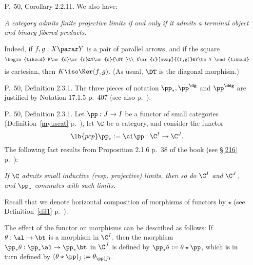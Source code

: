 \documentclass[12pt]{article}
\theoremstyle{remark}
\theoremstyle{definition}
\begin{document}


\begin{s}
P.~50, Corollary 2.2.11. We also have:

\emph{A category admits finite projective limits if and only if it admits a terminal object and binary fibered products.}

Indeed, if $f,g:X\parar Y$ is a pair of parallel arrows, and if the square 
$$
\begin{tikzcd}
K\ar{d}\ar{r}&Y\ar{d}{\DT}\\ 
X\ar{r}[swap]{(f,g)}&Y\tm Y
\end{tikzcd}
$$
is cartesian, then $K\iso\Ker(f,g)$. (As usual, $\DT$ is the diagonal morphism.)
\end{s}

%

\begin{s}
P.~50, Definition 2.3.1. The three pieces of notation $\pp_*,\pp^\dg$ and $\pp^\ddg$ are justified by Notation 17.1.5 p.~407 (see also  p.~). 
\end{s} 

% 

\begin{s}
P.~50, Definition 2.3.1. Let $\pp:J\to I$ be a functor of small categories (Definition~\ref{myuscat} p.~), let $\C$ be a category, and consider the functor 
\begin{equation}\lb{pcp}
\pp_*:=\ci\pp:\C^I\to\C^J.
\end{equation}
The following fact results from Proposition 2.1.6 p.~38 of the book (see \S\ref{216} p.~): 

\emph{If $\C$ admits small inductive (resp. projective) limits, then so do $\C^I$ and $\C^J$, and $\pp_*$ commutes with such limits.} 

Recall that we denote horizontal composition of morphisms of functors by $\star$ (see Definition~\ref{dil1} p.~).

The effect of the functor  on morphisms can be described as follows: If $\theta:\al\to\bt$ is a morphism in $\C^I$, then the morphism $\pp_*\theta:\pp_*\al\to\pp_*\bt$ in $\C^J$ is defined by $\pp_*\theta:=\theta\star\pp$, which is in turn defined by $(\theta\star\pp)_j:=\theta_{\pp(j)}$. 
\end{s} 

%
\end{document}

